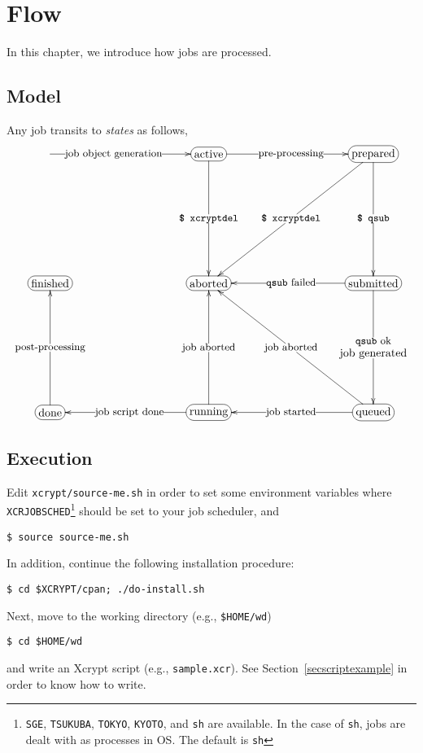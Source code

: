 \documentclass[a4paper,10pt]{report}
\begin{document}
\chapter{Flow}

In this chapter, we introduce how jobs are processed.

\section{Model}\label{sec:states}

Any job transits to \textit{states} as follows,
\[
\entrymodifiers={+[F-:<10pt>]}
\xymatrix@=100pt{
  *{} \ar[r]|(.4){\txt{\small job object generation}} &
  \txt{active} \ar[r]|{\txt{\small pre-processing}} \ar[d]|{\txt{\small \texttt{\$ xcryptdel}}}&
  \txt{prepared} \ar[d]|{\txt{\small \texttt{\$ qsub}}} \ar[ld]|{\txt{\small \texttt{\$ xcryptdel}}}\\
  \txt{finished} &
  \txt{aborted} &
  \txt{submitted} \ar[d]|{\txt{\small \texttt{qsub} ok\\job generated}} \ar[l]|{\txt{\small \texttt{qsub} failed}}\\
  \txt{done} \ar[u]|{\txt{\small post-processing}} &
  \txt{running} \ar[l]|{\txt{\small job script done}} \ar[u]|{\txt{\small job aborted}} &
  \txt{queued} \ar[l]|{\txt{\small job started}} \ar[lu]|{\txt{\small job aborted}}
}
\]

\section{Execution}

Edit \texttt{xcrypt/source-me.sh} in order to set some environment
variables where \texttt{XCRJOBSCHED}\footnote{\texttt{SGE},
\texttt{TSUKUBA}, \texttt{TOKYO}, \texttt{KYOTO}, and \texttt{sh} are
available.  In the case of \texttt{sh}, jobs are dealt with as
processes in OS.  The default is \texttt{sh}} should be set to your
job scheduler, and
\begin{screen}
\texttt{\$ source source-me.sh}
\end{screen}
In addition, continue the following installation procedure:
\begin{screen}
\texttt{\$ cd \$XCRYPT/cpan; ./do-install.sh}
\end{screen}

Next, move to the working directory (e.g., \texttt{\$HOME/wd})
\begin{screen}
\texttt{\$ cd \$HOME/wd}
\end{screen}
and write an Xcrypt script (e.g., \texttt{sample.xcr}).  See
Section~\ref{secscriptexample} in order to know how to write.
\end{document}
